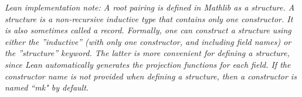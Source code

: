 {\it Lean implementation note: A root pairing is defined in Mathlib as a {\it structure}. A structure is a non-recursive inductive 
type that contains only one constructor. It is also sometimes called a {\it record}. Formally, one can construct a structure using either
the ''inductive'' (with only one constructor, and including field names) or the ''structure'' keyword. The latter is more convenient for defining a structure,
since Lean automatically generates the projection functions for each field. If the constructor name is not provided when defining a structure, then a 
constructor is named ``mk" by default.}



